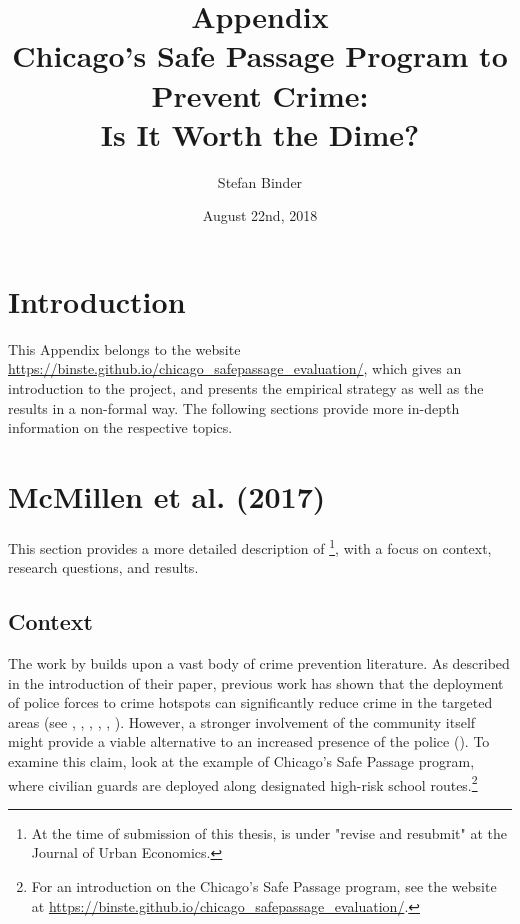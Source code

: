 \documentclass[]{article}
\title{\textsf{Appendix\\Chicago's Safe Passage Program to Prevent Crime: \\Is It Worth the Dime?}}
\author{\textsf{Stefan Binder}}
\date{August 22nd, 2018}
\begin{document}
\maketitle

\tableofcontents
\newpage
\section{Introduction}
This Appendix belongs to the website \url{https://binste.github.io/chicago_safepassage_evaluation/}, which gives an introduction to the project, and presents the empirical strategy as well as the results in a non-formal way. The following sections provide more in-depth information on the respective topics.

\section{McMillen et al. (2017)}
This section provides a more detailed description of \cite{mcmillen2017}\footnote{At the time of submission of this thesis, \cite{mcmillen2017} is under "revise and resubmit" at the Journal of Urban Economics.}, with a focus on context, research questions, and results.

\subsection{Context}
The work by \cite{mcmillen2017} builds upon a vast body of crime prevention literature. As described in the introduction of their paper, previous work has shown that the deployment of police forces to crime hotspots can significantly reduce crime in the targeted areas (see \citealt{di2004police}, \citealt{klick2005using},  \citealt{draca2011panic}, \citealt{weisburd2009hot}, \citealt{braga2014effects}, \citealt{lum2014evidence}). However, a stronger involvement of the community itself might provide a viable alternative to an increased presence of the police (\citealt{krivo2014reducing}). To examine this claim, \cite{mcmillen2017} look at the example of Chicago's Safe Passage program, where civilian guards are deployed along designated high-risk school routes.\footnote{For an introduction on the Chicago's Safe Passage program, see the website at \url{https://binste.github.io/chicago_safepassage_evaluation/}.}
\end{document}
